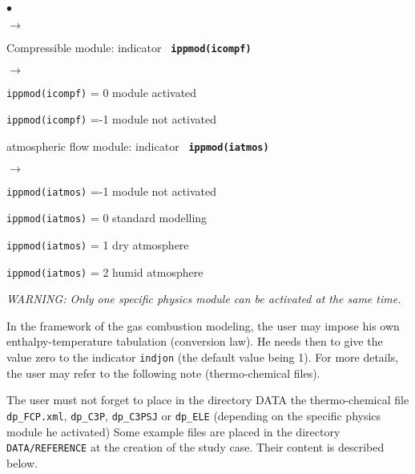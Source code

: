 {{\begin{list}{$\bullet$}{}
\begin{list}{$\rightarrow$}{}
         \end{list}
       \item Compressible module: indicator {\bf \tt
             ippmod(icompf)}
        \begin{list}{$\rightarrow$}{}
               \item \texttt{ippmod(icompf)} = 0 module activated
               \item \texttt{ippmod(icompf)} =-1 module not activated
         \end{list}
       \item atmospheric flow module: indicator {\bf \tt
             ippmod(iatmos)}
        \begin{list}{$\rightarrow$}{}
               \item \texttt{ippmod(iatmos)} =-1 module not activated
               \item \texttt{ippmod(iatmos)} = 0 standard modelling
               \item \texttt{ippmod(iatmos)} = 1 dry atmosphere
               \item \texttt{ippmod(iatmos)} = 2 humid atmosphere
         \end{list}
\end{list}

{\em WARNING: Only one specific physics module can be activated at the
same time.}

In the framework of the gas combustion modeling, the user may impose
his own enthalpy-temperature tabulation (conversion law). He needs then
to give the
value zero to the indicator \texttt{indjon} (the default value
being 1). For more details, the user may refer to the following note
(thermo-chemical files).

The user must not forget to place in the directory DATA the
thermo-chemical file \texttt{dp\_FCP.xml}, \texttt{dp\_C3P}, \texttt{dp\_C3PSJ} or
\texttt{dp\_ELE} (depending on the specific physics module he activated)
Some example files are placed in the directory \texttt{DATA/REFERENCE} at the creation of the
study case. Their content is described below.

}}

